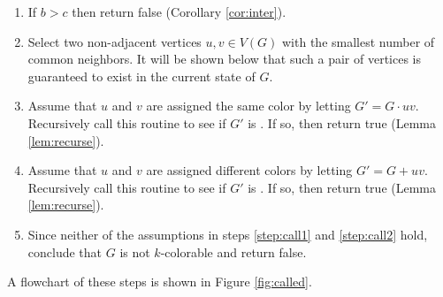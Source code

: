 \begin{enumerate}
\item \label{step:common} If \(b>c\) then return false (Corollary \ref{cor:inter}).

\item \label{step:select2} Select two non-adjacent vertices \(u,v\in V(G)\) with the smallest number of common
  neighbors.  It will be shown below that such a pair of vertices is guaranteed to exist in the current state of
  \(G\).

\item \label{step:call1} Assume that \(u\) and \(v\) are assigned the same color by letting \(G'=G\cdot uv\).
  Recursively call this routine to see if \(G'\) is .  If so, then return true (Lemma
  \ref{lem:recurse}).

\item \label{step:call2} Assume that \(u\) and \(v\) are assigned different colors by letting \(G'=G+uv\).
  Recursively call this routine to see if \(G'\) is .  If so, then return true (Lemma
  \ref{lem:recurse}).

\item \label{step:fail} Since neither of the assumptions in steps \ref{step:call1} and \ref{step:call2} hold,
  conclude that \(G\) is not \(k\)-colorable and return false.
\end{enumerate}

A flowchart of these steps is shown in Figure \ref{fig:called}.

